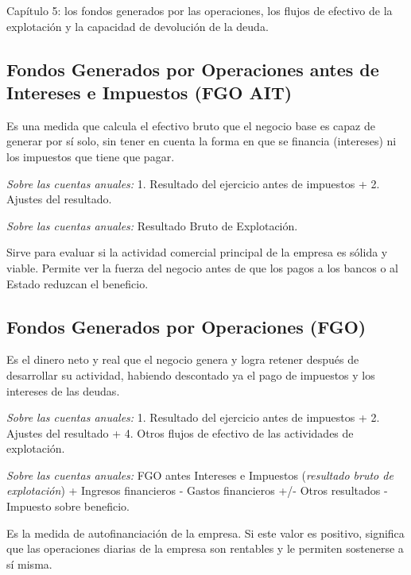 \documentclass[12pt]{book} %
\begin{document}
Capítulo 5: los fondos generados por las operaciones, los flujos de
efectivo de la explotación y la capacidad de devolución de la deuda.

\hypertarget{fondos-generados-por-operaciones-antes-de-intereses-e-impuestos-fgo-ait}{%
\subsection{Fondos Generados por Operaciones antes de Intereses e
Impuestos (FGO
AIT)}\label{fondos-generados-por-operaciones-antes-de-intereses-e-impuestos-fgo-ait}}

Es una medida que calcula el efectivo bruto que el negocio base es capaz
de generar por sí solo, sin tener en cuenta la forma en que se financia
(intereses) ni los impuestos que tiene que pagar.

\emph{Sobre las cuentas anuales:} 1. Resultado del ejercicio antes de
impuestos + 2. Ajustes del resultado.

\emph{Sobre las cuentas anuales:} Resultado Bruto de Explotación.

Sirve para evaluar si la actividad comercial principal de la empresa es
sólida y viable. Permite ver la fuerza del negocio antes de que los
pagos a los bancos o al Estado reduzcan el beneficio.

\hypertarget{fondos-generados-por-operaciones-fgo}{%
\subsection{Fondos Generados por Operaciones
(FGO)}\label{fondos-generados-por-operaciones-fgo}}

Es el dinero neto y real que el negocio genera y logra retener después
de desarrollar su actividad, habiendo descontado ya el pago de impuestos
y los intereses de las deudas.

\emph{Sobre las cuentas anuales:} 1. Resultado del ejercicio antes de
impuestos + 2. Ajustes del resultado + 4. Otros flujos de efectivo de
las actividades de explotación.

\emph{Sobre las cuentas anuales:} FGO antes Intereses e Impuestos
(\emph{resultado bruto de explotación}) + Ingresos financieros - Gastos
financieros +/- Otros resultados - Impuesto sobre beneficio.

Es la medida de autofinanciación de la empresa. Si este valor es
positivo, significa que las operaciones diarias de la empresa son
rentables y le permiten sostenerse a sí misma.
\end{document}
